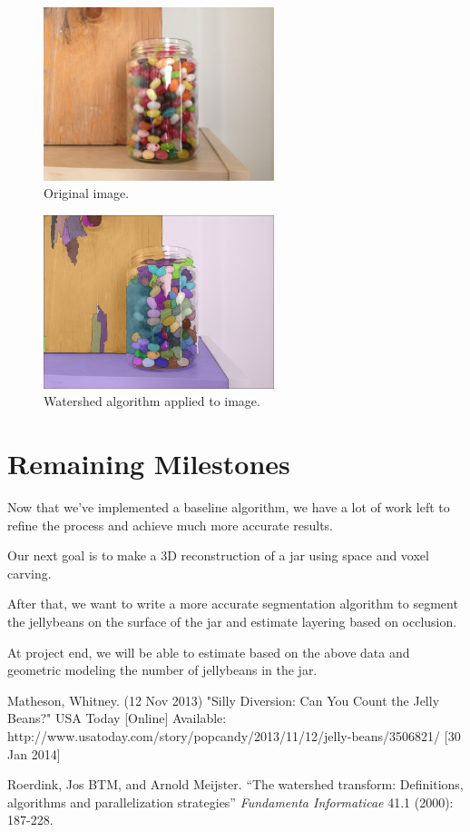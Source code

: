 \documentclass{article}
\begin{document}
\begin{figure}[h]
\centering
\includegraphics[width=0.6\textwidth]{../img/img1.jpg}
\caption{Original image.}
\end{figure}

\begin{figure}[h]
\centering
\includegraphics[width=0.6\textwidth]{../wshed.jpg}
\caption{Watershed algorithm applied to image.}
\end{figure}

\section*{Remaining Milestones}

Now that we've implemented a baseline algorithm, we have a lot of work left to refine the process and achieve much more accurate results.

Our next goal is to make a 3D reconstruction of a jar using space and voxel carving.

After that, we want to write a more accurate segmentation algorithm to segment the jellybeans on the surface of the jar and estimate layering based on occlusion.

At project end, we will be able to estimate based on the above data and geometric modeling the number of jellybeans in the jar. 

\begin{thebibliography}{9}

	Matheson, Whitney. (12 Nov 2013) "Silly Diversion: Can You Count the Jelly Beans?" USA Today 		[Online] Available: http://www.usatoday.com/story/popcandy/2013/11/12/jelly-beans/3506821/ [30 Jan 2014]
	
Roerdink, Jos BTM, and Arnold Meijster. ``The watershed transform: Definitions, algorithms and parallelization strategies'' \emph{Fundamenta Informaticae} 41.1 (2000): 187-228.

\end{thebibliography}
\end{document}

